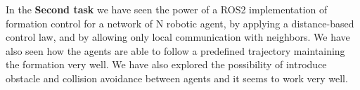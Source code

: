\documentclass[a4paper,11pt,oneside]{book}
\begin{document}
\bigskip
In the \textbf{Second task} we have seen the power of a ROS2 implementation of formation control for a network of N robotic agent, by applying a distance-based control law, and by allowing only local communication with neighbors. We have also seen how the agents are able to follow a predefined trajectory maintaining the formation very well.
We have also explored the possibility of introduce obstacle and collision avoidance between agents and it seems to work very well.


%


\end{document}
